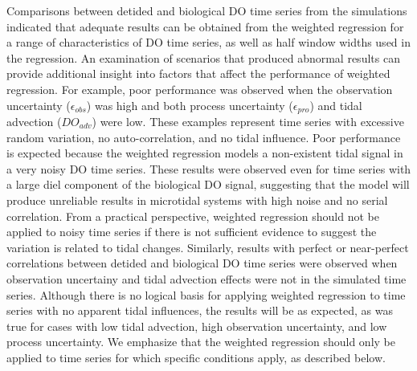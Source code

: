 \documentclass[letterpaper,12pt,oneside]{article}\usepackage[]{graphicx}\usepackage[]{color}
\begin{document}
Comparisons between detided and biological \ac{DO} time series from the simulations indicated that adequate results can be obtained from the weighted regression for a range of characteristics of \ac{DO} time series, as well as half window widths used in the regression.  An examination of scenarios that produced abnormal results can provide additional insight into factors that affect the performance of weighted regression.  For example, poor performance was observed when the observation uncertainty ($\epsilon_{obs}$) was high and both process uncertainty ($\epsilon_{pro}$) and tidal advection ($DO_{adv}$) were low.  These examples represent time series with excessive random variation, no auto-correlation, and no tidal influence.  Poor performance is expected because the weighted regression models a non-existent tidal signal in a very noisy \ac{DO} time series.  These results were observed even for time series with a large diel component of the biological \ac{DO} signal, suggesting that the model will produce unreliable results in microtidal systems with high noise and no serial correlation.  From a practical perspective, weighted regression should not be applied to noisy time series if there is not sufficient evidence to suggest the variation is related to tidal changes.  Similarly, results with perfect or near-perfect correlations between detided and biological \ac{DO} time series were observed when observation uncertainy and tidal advection effects were not in the simulated time series.  Although there is no logical basis for applying weighted regression to time series with no apparent tidal influences, the results will be as expected, as was true for cases with low tidal advection, high observation uncertainty, and low process uncertainty.  We emphasize that the weighted regression should only be applied to time series for which specific conditions apply, as described below.  
\end{document}
